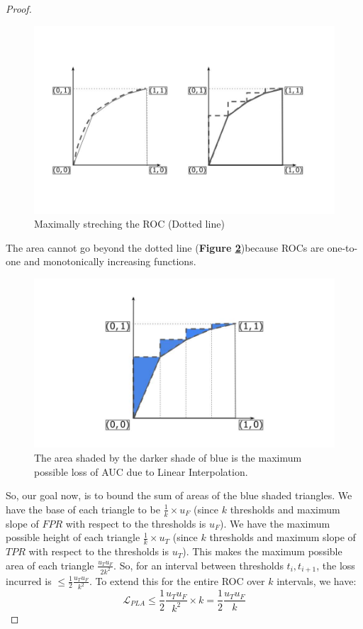 \documentclass{article}
\begin{document}
\begin{proof}
\begin{figure}[!h]
    \centering
    \includegraphics[scale = 0.3]{diagrams/PLA_proof3.jpg}
    \caption{Maximally streching the ROC (Dotted line)}
    \label{fig:enter-label}
\end{figure}

The area cannot go beyond the dotted line (\textbf{Figure \ref{fig:PLA2_p2}})because ROCs are one-to-one and monotonically increasing functions.
\begin{figure}[!h]
    \centering
    \includegraphics[scale = 0.25]{diagrams/PLA_proof2.jpg}
    \caption{The area shaded by the darker shade of blue is the maximum possible loss of AUC due to Linear Interpolation.}
    \label{fig:PLA2_p2}
\end{figure}
So, our goal now, is to bound the sum of areas of the blue shaded triangles. We have the base of each triangle to be $\frac{1}{k}\times u_F$ (since $k$ thresholds and maximum slope of $FPR$ with respect to the thresholds is $u_F$). We have the maximum possible height of each triangle $\frac{1}{k}\times u_T$ (since $k$ thresholds and maximum slope of $TPR$ with respect to the thresholds is $u_T$). This makes the maximum possible area of each triangle $\frac{u_T u_F}{2k^2}$.
So, for an interval between thresholds $t_i, t_{i+1}$, the loss incurred is $\leq \frac{1}{2} \frac{u_T u_F}{k^2}$. To extend this for the entire ROC over $k$ intervals, we have:
\begin{equation*}
    \mathcal{L}_{PLA} \leq \frac{1}{2} \frac{u_Tu_F}{k^2} \times k  = \frac{1}{2} \frac{u_Tu_F}{k}    
\end{equation*}
\end{proof}
\end{document}
